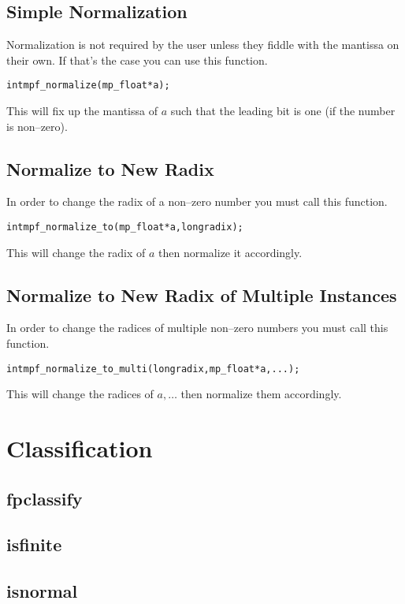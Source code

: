\documentclass[a4paper]{book}
\theoremstyle{definition}
\theoremstyle{remark}
\begin{document}
\subsection{Simple Normalization}
Normalization is not required by the user unless they fiddle with the mantissa on their own.  If that's the case you can use this function.
\begin{alltt}
int  mpf_normalize(mp_float *a);
\end{alltt}
This will fix up the mantissa of $a$ such that the leading bit is one (if the number is non--zero).  

\subsection{Normalize to New Radix}
In order to change the radix of a non--zero number you must call this function.

\begin{alltt}
int  mpf_normalize_to(mp_float *a, long radix);
\end{alltt}
This will change the radix of $a$ then normalize it accordingly.

\subsection{Normalize to New Radix of Multiple Instances}
In order to change the radices of multiple non--zero numbers you must call this function.

\begin{alltt}
int  mpf_normalize_to_multi(long radix, mp_float *a, ...);
\end{alltt}
This will change the radices of $a,\ldots$ then normalize them accordingly.

\section{Classification}
\subsection{fpclassify}
\subsection{isfinite}
\subsection{isnormal}
\end{document}
